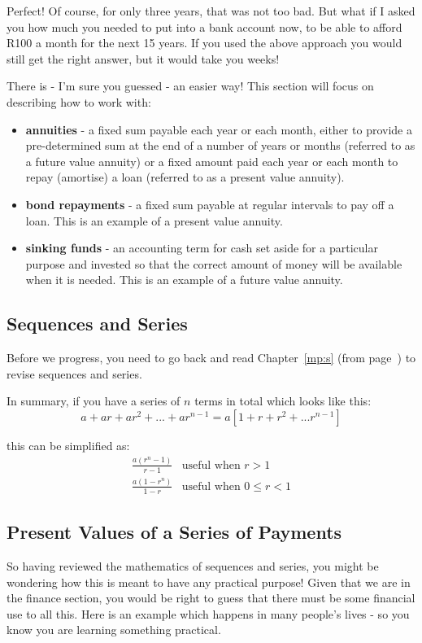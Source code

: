 Perfect! Of course, for only three years, that was not too bad. But what if I asked you how much you needed to put into a bank account now, to be able to afford R100 a month for the next 15 years. If you used the above approach you would still get the right answer, but it would take you weeks!

There is - I'm sure you guessed - an easier way! This section will focus on describing how to work with:
\begin{itemize}
\item{\textbf{annuities} - a fixed sum payable each year or each month, either to provide a pre-determined sum at the end of a number of years or months (referred to as a future value annuity) or a fixed amount paid each year or each month to repay (amortise) a loan (referred to as a present value annuity).}
\item{\textbf{bond repayments} - a fixed sum payable at regular intervals to pay off a loan. This is an example of a present value annuity.}
\item{\textbf{sinking funds} - an accounting term for cash set aside for a particular purpose and invested so that the correct amount of money will be available when it is needed. This is an example of a future value annuity.}
\end{itemize}

\subsection{Sequences and Series}
\label{m:f:ss}
Before we progress, you need to go back and read Chapter~\ref{mp:s} (from page~\pageref{mp:s}) to revise sequences and series.

In summary, if you have a series of $n$ terms in total which looks like this:
\begin{equation*}
a + ar + ar^2 + ... + ar^{n-1} = a [ 1 + r + r^2 + ... r^{n-1} ]
\end{equation*}

this can be simplified as:
\begin{eqnarray*}
\frac{a (r^n - 1)}{r-1} &\mbox{useful when $r>1$}\\
\frac{a (1 - r^n)}{1-r} &\mbox{useful when $0\le r <1$}
\end{eqnarray*}

\subsection{Present Values of a Series of Payments}\label{presentvalues}
So having reviewed the mathematics of sequences and series, you might be wondering how this is meant to have any practical purpose! Given that we are in the finance section, you would be right to guess that there must be some financial use to all this. Here is an example which happens in many people's lives - so you know you are learning something practical.

